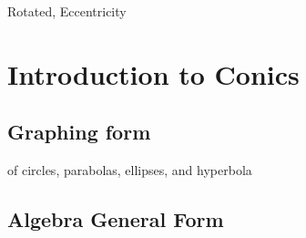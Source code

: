 

Rotated, Eccentricity

\newpage
\chapterminitoc

\newpage
\section{Introduction to Conics}
\noindent{}
\subsection{Graphing form}
of circles, parabolas, ellipses, and hyperbola

\subsection{Algebra General Form}
